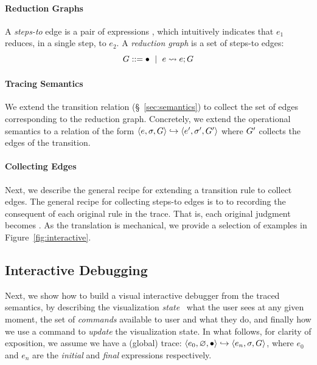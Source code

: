 \paragraph{Reduction Graphs}
%
A \emph{steps-to} edge is a pair of expressions , which
intuitively indicates that $e_1$ reduces, in a single step, to $e_2$.
%
%
A \emph{reduction graph} is a set of steps-to edges:
$$G ::= \bullet \ \mid \  e \leadsto e; G$$  %

\paragraph{Tracing Semantics}
%
We extend the transition relation (\S~\ref{sec:semantics}) to
collect the set of edges corresponding to the reduction graph.
%
Concretely, we extend the operational semantics to
a relation of the form $\langle e, \sigma, G \rangle \hookrightarrow \langle e', \sigma', G' \rangle$
where $G'$ collects the edges of the transition.

\paragraph{Collecting Edges}
%
Next, we describe the general recipe for extending a transition
rule to collect edges.
%
The general recipe for collecting steps-to edges is to
to recording the consequent of each original rule in the
trace. That is, each original judgment 
becomes .
%
As the translation is mechanical, we provide a selection of examples
in Figure~\ref{fig:interactive}.



\subsection{Interactive Debugging}
\label{sec:traversing-graph}

Next, we show how to build a visual interactive debugger
from the traced semantics, by describing the visualization
\emph{state} \ie\ what the user sees at any given moment,
the set of \emph{commands} available to user and what
they do, and finally how we use a command to \emph{update}
the visualization state. In what follows, for clarity of
exposition, we assume we have a (global) trace:
$\langle e_0, \varnothing, \bullet \rangle \hookrightarrow \langle e_n, \sigma, G \rangle$, where
$e_0$ and $e_n$ are the \emph{initial} and \emph{final}
expressions respectively.

